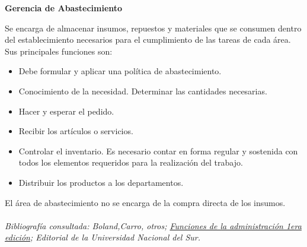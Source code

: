 \documentclass[a4paper,10pt,titlepage]{article}
\begin{document}
\begin{enumerate}
\textbf{Gerencia de Abastecimiento}

	\indent Se encarga de almacenar insumos, repuestos y materiales que se consumen dentro del establecimiento necesarios para el cumplimiento de las tareas de cada \'area. Sus principales funciones son: 
		\begin{itemize}
		\item Debe formular y aplicar una política de abastecimiento.
		\item Conocimiento de la necesidad. Determinar las cantidades necesarias.
		\item Hacer y esperar el pedido.
		\item Recibir los art\'iculos o servicios.
		\item Controlar el inventario. Es necesario contar en forma regular y sostenida con todos los elementos requeridos para la realizaci\'on del trabajo.
		\item Distribuir los productos a los departamentos.
		\end{itemize}
	\indent El \'area de abastecimiento no se encarga de la compra directa de los insumos.\\\\
	
	\indent \textit{Bibliografía consultada: Boland,Carro, otros; \underline{Funciones de la administración 1era edición}; Editorial de la Universidad Nacional del Sur.}\\


\end{enumerate}
\end{document}
